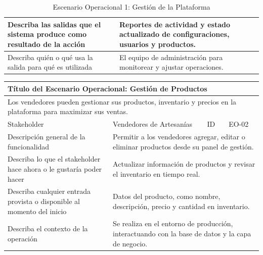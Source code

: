 \documentclass[12pt]{article}
\begin{document}
\begin{table}[H]
\begin{tabular}{|p{4cm}|p{4cm}|p{4cm}|p{4cm}|}
        \multicolumn{1}{|p{4cm}|}{\cellcolor{teal!50}Describa las salidas que el sistema produce como resultado de la acción} & \multicolumn{3}{p{12cm}|}{Reportes de actividad y estado actualizado de configuraciones, usuarios y productos.} \\ \hline
        \multicolumn{1}{|p{4cm}|}{\cellcolor{teal!50}Describa quién o qué usa la salida para qué es utilizada} & \multicolumn{3}{p{12cm}|}{El equipo de administración para monitorear y ajustar operaciones.} \\ \hline
    \end{tabular}
    \caption{Escenario Operacional 1: Gestión de la Plataforma}
    \label{tab:escenario_operacional_1}
\end{table}

\begin{table}[H]
    \centering
    \begin{tabular}{|p{4cm}|p{4cm}|p{4cm}|p{4cm}|}
        \hline
        \multicolumn{4}{|l|}{\cellcolor{teal!50}\textbf{Título del Escenario Operacional: Gestión de Productos}} \\ \hline
        \multicolumn{4}{|p{16cm}|}{Los vendedores pueden gestionar sus productos, inventario y precios en la plataforma para maximizar sus ventas.} \\ \hline
        \multicolumn{1}{|p{4cm}|}{\cellcolor{teal!50}Stakeholder} & \multicolumn{1}{p{6cm}|}{Vendedores de Artesanías} & \multicolumn{1}{|p{2cm}|}{\cellcolor{teal!50}ID} & \multicolumn{1}{p{4cm}|}{EO-02} \\ \hline
        \multicolumn{1}{|p{4cm}|}{\cellcolor{teal!50}Descripción general de la funcionalidad} & \multicolumn{3}{p{12cm}|}{Permitir a los vendedores agregar, editar o eliminar productos desde su panel de gestión.} \\ \hline
        \multicolumn{1}{|p{4cm}|}{\cellcolor{teal!50}Describa lo que el stakeholder hace ahora o le gustaría poder hacer} & \multicolumn{3}{p{12cm}|}{Actualizar información de productos y revisar el inventario en tiempo real.} \\ \hline
        \multicolumn{1}{|p{4cm}|}{\cellcolor{teal!50}Describa cualquier entrada provista o disponible al momento del inicio} & \multicolumn{3}{p{12cm}|}{Datos del producto, como nombre, descripción, precio y cantidad en inventario.} \\ \hline
        \multicolumn{1}{|p{4cm}|}{\cellcolor{teal!50}Describa el contexto de la operación} & \multicolumn{3}{p{12cm}|}{Se realiza en el entorno de producción, interactuando con la base de datos y la capa de negocio.} \\ \hline

\end{tabular}
\end{table}
\end{document}
